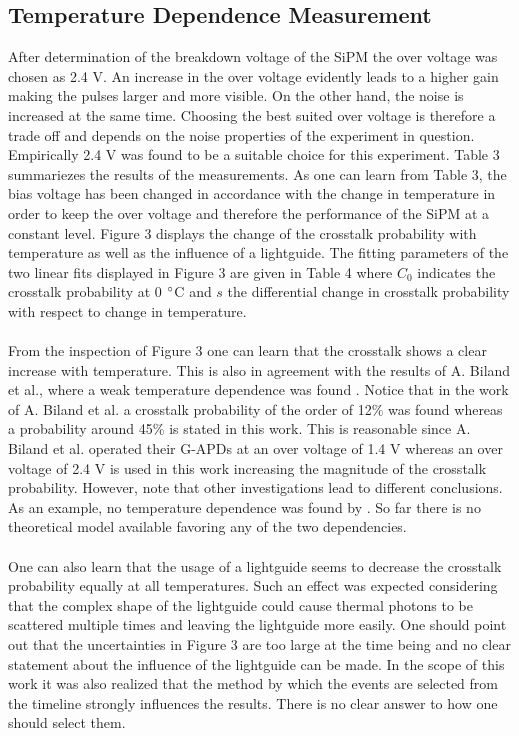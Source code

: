 \documentclass[10pt,a4paper]{article}
\begin{document}
\begin{multicols}{2}
\subsection{Temperature Dependence Measurement}
After determination of the breakdown voltage of the SiPM the over voltage was chosen as 2.4 V. An increase in the over voltage evidently leads to a higher gain making the pulses larger and more visible. On the other hand, the noise is increased at the same time. Choosing the best suited over voltage is therefore a trade off and depends on the noise properties of the experiment in question. Empirically 2.4 V was found to be a suitable choice for this experiment. Table 3 summariezes the results of the measurements. As one can learn from Table 3, the bias voltage has been changed in accordance with the change in temperature in order to keep the over voltage and therefore the performance of the SiPM at a constant level. Figure 3 displays the change of the crosstalk probability with temperature as well as the influence of a lightguide. The fitting parameters of the two linear fits displayed in Figure 3 are given in Table 4 where $C_0$ indicates the crosstalk probability at 0 $\degree$C and $s$ the differential change in crosstalk probability with respect to change in temperature. \\ \\ \noindent
From the inspection of Figure 3 one can learn that the crosstalk shows a clear increase with temperature. This is also in agreement with the results of A. Biland et al., where a weak temperature dependence was found \cite{gapd}. Notice that in the work of A. Biland et al. a crosstalk probability of the order of 12$\%$ was found whereas a probability around 45$\%$ is stated in this work. This is reasonable since A. Biland et al. operated their G-APDs at an over voltage of 1.4 V whereas an over voltage of 2.4 V is used in this work increasing the magnitude of the crosstalk probability. However, note that other investigations lead to different conclusions. As an example, no temperature dependence was found by \cite{crossref}. So far there is no theoretical model available favoring any of the two dependencies. \\ \\  \noindent
One can also learn that the usage of a lightguide seems to decrease the crosstalk probability equally at all temperatures.
Such an effect was expected considering that the complex shape of the lightguide could cause thermal photons to be scattered multiple times and leaving the lightguide more easily. One should point out that the uncertainties in Figure 3 are too large at the time being and no clear statement about the influence of the lightguide can be made. In the scope of this work it was also realized that the method by which the events are selected from the timeline strongly influences the results. There is no clear answer to how one should select them.
\end{multicols}
\end{document}
